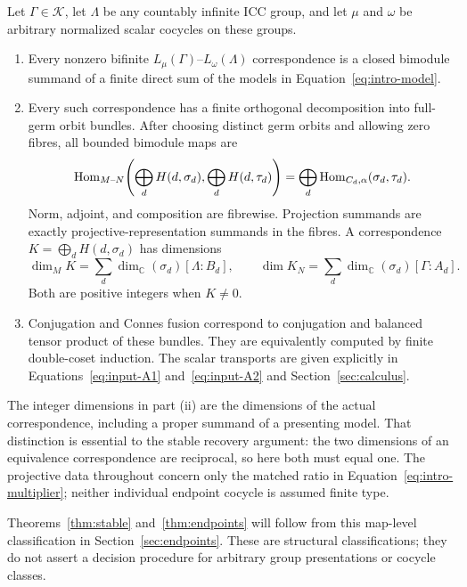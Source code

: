\begin{theorem}\label{thm:correspondences}
Let $\Gamma\in\mathscr K$, let $\Lambda$ be any countably infinite ICC
group, and let $\mu$ and $\omega$ be arbitrary normalized scalar cocycles
on these groups.
\begin{enumerate}[label=\textup{(\roman*)}]
\item Every nonzero bifinite $L_\mu(\Gamma)$--$L_\omega(\Lambda)$
correspondence is a closed bimodule summand of a finite direct sum of the
models in Equation~\eqref{eq:intro-model}.
\item Every such correspondence has a finite orthogonal decomposition
into full-germ orbit bundles. After choosing distinct germ orbits and
allowing zero fibres, all bounded bimodule maps are
\begin{equation}\label{eq:intro-hom}
 \operatorname{Hom}_{M\text{--}N}\!\left(\bigoplus_d H(d,\sigma_d),
                          \bigoplus_d H(d,\tau_d)\right)
  =\bigoplus_d\operatorname{Hom}_{C_d,\alpha}(\sigma_d,\tau_d).
\end{equation}
Norm, adjoint, and composition are fibrewise. Projection summands are
exactly projective-representation summands in the fibres. A correspondence
$K=\bigoplus_d H(d,\sigma_d)$ has dimensions
\[
 \dim_M K=\sum_d\dim_{\mathbb C}(\sigma_d)[\Lambda:B_d],\qquad
 \dim K_N=\sum_d\dim_{\mathbb C}(\sigma_d)[\Gamma:A_d].
\]
Both are positive integers when $K\ne0$.
\item Conjugation and Connes fusion correspond to conjugation and balanced
tensor product of these bundles. They are equivalently computed by finite
double-coset induction. The scalar transports are given explicitly in
Equations~\eqref{eq:input-A1} and~\eqref{eq:input-A2} and
Section~\ref{sec:calculus}.
\end{enumerate}
\end{theorem}

The integer dimensions in part \textup{(ii)} are the dimensions of the
actual correspondence, including a proper summand of a presenting model.
That distinction is essential to the stable recovery argument: the two
dimensions of an equivalence correspondence are reciprocal, so here both
must equal one. The projective data throughout concern only the matched
ratio in Equation~\eqref{eq:intro-multiplier}; neither individual endpoint
cocycle is assumed finite type.

Theorems~\ref{thm:stable} and~\ref{thm:endpoints} will follow from this
map-level classification in Section~\ref{sec:endpoints}. These are
structural classifications; they do not assert a decision procedure for
arbitrary group presentations or cocycle classes.

